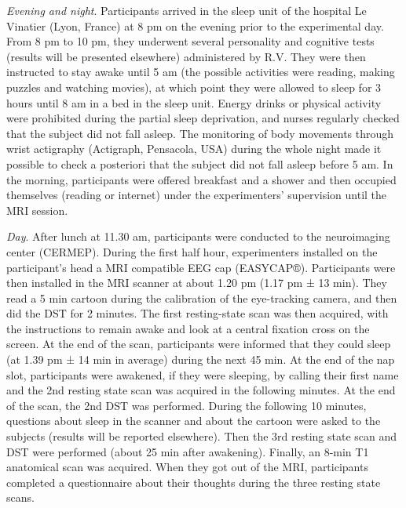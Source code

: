 
\emph{Evening and night}. Participants arrived in the sleep unit of the hospital Le Vinatier (Lyon, France) at 8 pm on the evening prior to the experimental day. From 8 pm to 10 pm, they underwent several personality and cognitive tests (results will be presented elsewhere) administered by R.V. They were then instructed to stay awake until 5 am (the possible activities were reading, making puzzles and watching movies), at which point they were allowed to sleep for 3 hours until 8 am in a bed in the sleep unit. Energy drinks or physical activity were prohibited during the partial sleep deprivation, and nurses regularly checked that the subject did not fall asleep. The monitoring of body movements through wrist actigraphy (Actigraph, Pensacola, USA) during the whole night made it possible to check a posteriori that the subject did not fall asleep before 5 am. In the morning, participants were offered breakfast and a shower and then occupied themselves (reading or internet) under the experimenters’ supervision until the MRI session.

\emph{Day}. After lunch at 11.30 am, participants were conducted to the neuroimaging center (CERMEP). During the first half hour, experimenters installed on the participant’s head a MRI compatible EEG cap (EASYCAP®). Participants were then installed in the MRI scanner at about 1.20 pm (1.17 pm ± 13 min). They read a 5 min cartoon during the calibration of the eye-tracking camera, and then did the DST for 2 minutes. The first resting-state scan was then acquired, with the instructions to remain awake and look at a central fixation cross on the screen. At the end of the scan, participants were informed that they could sleep (at 1.39 pm ± 14 min in average) during the next 45 min. At the end of the nap slot, participants were awakened, if they were sleeping, by calling their first name and the 2nd resting state scan was acquired in the following minutes. At the end of the scan, the 2nd DST was performed. During the following 10 minutes, questions about sleep in the scanner and about the cartoon were asked to the subjects (results will be reported elsewhere). Then the 3rd resting state scan and DST were performed (about 25 min after awakening). Finally, an 8-min T1 anatomical scan was acquired. When they got out of the MRI, participants completed a questionnaire about their thoughts during the three resting state scans.

